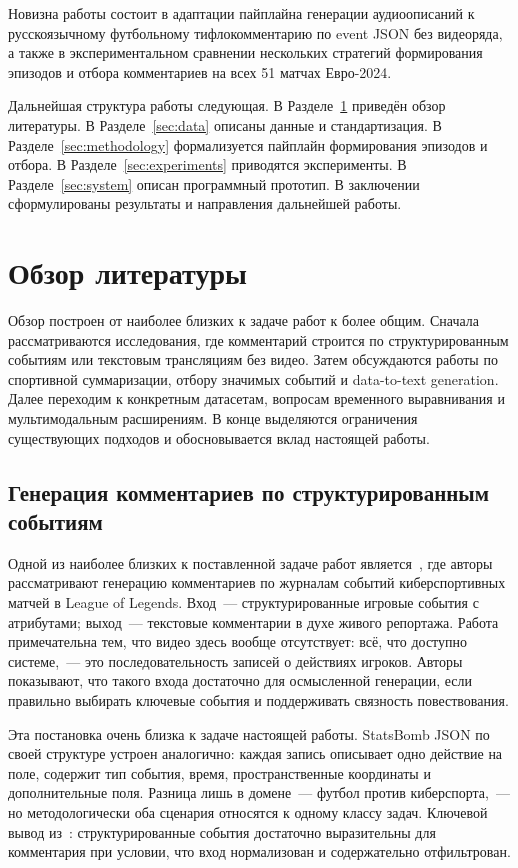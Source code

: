 \documentclass[a4paper,14pt]{extarticle}
\numberwithin{table}{section}
\numberwithin{figure}{section}
\numberwithin{equation}{section}
\begin{document}
Новизна работы состоит в адаптации пайплайна генерации аудиоописаний к русскоязычному футбольному тифлокомментарию по event JSON без видеоряда, а также в экспериментальном сравнении нескольких стратегий формирования эпизодов и отбора комментариев на всех 51 матчах Евро-2024.

Дальнейшая структура работы следующая. В Разделе~\ref{sec:literature} приведён обзор литературы. В Разделе~\ref{sec:data} описаны данные и стандартизация. В Разделе~\ref{sec:methodology} формализуется пайплайн формирования эпизодов и отбора. В Разделе~\ref{sec:experiments} приводятся эксперименты. В Разделе~\ref{sec:system} описан программный прототип. В заключении сформулированы результаты и направления дальнейшей работы.

\section{Обзор литературы}\label{sec:literature}

Обзор построен от наиболее близких к задаче работ к более общим. Сначала рассматриваются исследования, где комментарий строится по структурированным событиям или текстовым трансляциям без видео. Затем обсуждаются работы по спортивной суммаризации, отбору значимых событий и data-to-text generation. Далее переходим к конкретным датасетам, вопросам временного выравнивания и мультимодальным расширениям. В конце выделяются ограничения существующих подходов и обосновывается вклад настоящей работы.

\subsection{Генерация комментариев по структурированным событиям}

Одной из наиболее близких к поставленной задаче работ является~\cite{wang2022commentary}, где авторы рассматривают генерацию комментариев по журналам событий киберспортивных матчей в League of Legends. Вход~--- структурированные игровые события с атрибутами; выход~--- текстовые комментарии в духе живого репортажа. Работа примечательна тем, что видео здесь вообще отсутствует: всё, что доступно системе,~--- это последовательность записей о действиях игроков. Авторы показывают, что такого входа достаточно для осмысленной генерации, если правильно выбирать ключевые события и поддерживать связность повествования.

Эта постановка очень близка к задаче настоящей работы. StatsBomb JSON по своей структуре устроен аналогично: каждая запись описывает одно действие на поле, содержит тип события, время, пространственные координаты и дополнительные поля. Разница лишь в домене~--- футбол против киберспорта,~--- но методологически оба сценария относятся к одному классу задач. Ключевой вывод из~\cite{wang2022commentary}: структурированные события достаточно выразительны для комментария при условии, что вход нормализован и содержательно отфильтрован.
\end{document}
